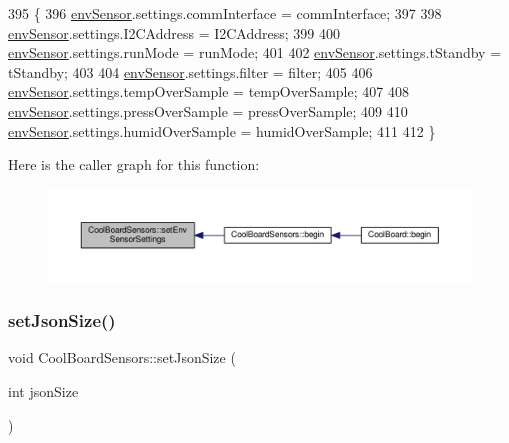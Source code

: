 \begin{DoxyCode}
395 \{
396   \hyperlink{classCoolBoardSensors_a868e38985e9a2412829fa2790ca13e2e}{envSensor}.settings.commInterface = commInterface;      
397   
398   \hyperlink{classCoolBoardSensors_a868e38985e9a2412829fa2790ca13e2e}{envSensor}.settings.I2CAddress = I2CAddress;
399   
400   \hyperlink{classCoolBoardSensors_a868e38985e9a2412829fa2790ca13e2e}{envSensor}.settings.runMode = runMode; 
401   
402   \hyperlink{classCoolBoardSensors_a868e38985e9a2412829fa2790ca13e2e}{envSensor}.settings.tStandby = tStandby; 
403   
404   \hyperlink{classCoolBoardSensors_a868e38985e9a2412829fa2790ca13e2e}{envSensor}.settings.filter = filter; 
405   
406   \hyperlink{classCoolBoardSensors_a868e38985e9a2412829fa2790ca13e2e}{envSensor}.settings.tempOverSample = tempOverSample;
407   
408   \hyperlink{classCoolBoardSensors_a868e38985e9a2412829fa2790ca13e2e}{envSensor}.settings.pressOverSample = pressOverSample;
409   
410   \hyperlink{classCoolBoardSensors_a868e38985e9a2412829fa2790ca13e2e}{envSensor}.settings.humidOverSample = humidOverSample;
411 
412 \}
\end{DoxyCode}
Here is the caller graph for this function\+:
\nopagebreak
\begin{figure}[H]
\begin{center}
\leavevmode
\includegraphics[width=350pt]{classCoolBoardSensors_a406307ffd70272282d91479c7ed8d66f_icgraph}
\end{center}
\end{figure}
\mbox{\label{classCoolBoardSensors_ab76e6dbd6efbcc25ff460535badd8d45}} 
\subsubsection{\texorpdfstring{set\+Json\+Size()}{setJsonSize()}}
{\footnotesize\ttfamily void Cool\+Board\+Sensors\+::set\+Json\+Size (\begin{DoxyParamCaption}\item[{int}]{json\+Size }\end{DoxyParamCaption})}

